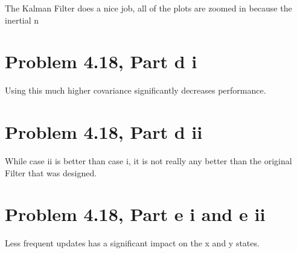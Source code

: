 \documentclass[paper=a4, fontsize=11pt]{scrartcl}
\numberwithin{equation}{section}		%
\numberwithin{figure}{section}			%
\numberwithin{table}{section}				%
\begin{document}
The Kalman Filter does a nice job, all of the plots are zoomed in because the inertial n
\begin{figure}[!htb]
	\centering
    
	\caption{ \label{fig:f7}}
\end{figure}

\begin{figure}[!htb]
	\centering
    
	\caption{ \label{fig:f8}}
\end{figure}

\begin{figure}[!htb]
	\centering
    
	\caption{ \label{fig:f9}}
\end{figure}


\begin{figure}[!htb]
	\centering
    
	\caption{ \label{fig:f10}}
\end{figure}

\section*{Problem 4.18, Part d i}

Using this much higher covariance significantly decreases performance.
\begin{figure}[!htb]
	\centering
    
	\caption{ \label{fig:f11}}
\end{figure}

\section*{Problem 4.18, Part d ii}
While case ii is better than case i, it is not really any better than the original Filter that was designed.

\begin{figure}[!htb]
	\centering
    
	\caption{ \label{fig:f12}}
\end{figure}

\section*{Problem 4.18, Part e i and e ii}
Less frequent updates has a significant impact on the x and y states. 

\begin{figure}[!htb]
	\centering
    
	\caption{ \label{fig:f13}}
\end{figure}
\end{document}
